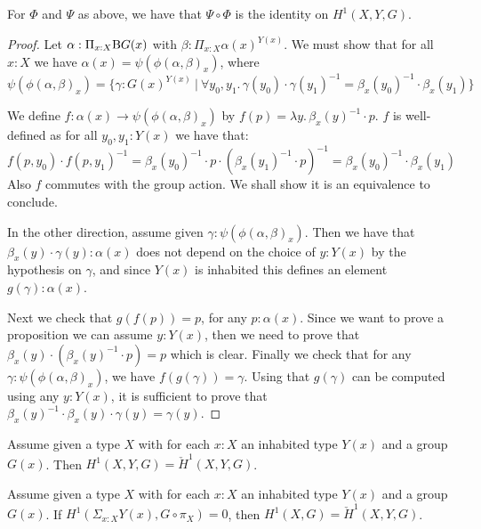 \begin{lemma}\label{PSiCircPhi}
  For $\Phi$ and $\Psi$ as above, we have that $\Psi\circ \Phi$ is the identity on $H^1(X,Y,G)$. 
\end{lemma}

\begin{proof}
Let $\alpha:\Pi_{x:X}\mathrm{B} G(x)$ with $\beta:\Pi_{x:X}\alpha(x)^{Y(x)}$. We must show that for all $x:X$ we have 
$\alpha(x) = \psi(\phi(\alpha,\beta)_x)$,
where
\[\psi(\phi(\alpha,\beta)_x) = \{\gamma:G(x)^{Y(x)}\ |\ \forall y_0,y_1.\, \gamma(y_0)\cdot\gamma(y_1)^{-1} = \beta_x(y_0)^{-1}\cdot\beta_x(y_1)\}\]

We define $f:\alpha(x)\to \psi(\phi(\alpha,\beta)_x)$ by $f(p) = \lambda y.\, \beta_x(y)^{-1}\cdot p$. $f$ is well-defined as for all $y_0,y_1:Y(x)$ we have that:
\[f(p,y_0)\cdot f(p,y_1)^{-1} = \beta_x(y_0)^{-1}\cdot p \cdot (\beta_x(y_1)^{-1}\cdot p)^{-1} = \beta_x(y_0)^{-1}\cdot\beta_x(y_1)\]
Also $f$ commutes with the group action. We shall show it is an equivalence to conclude. 

In the other direction, assume given $\gamma:\psi(\phi(\alpha,\beta)_x)$. Then we have that $\beta_x(y)\cdot\gamma(y):\alpha(x)$ does not depend on the choice of $y:Y(x)$ by the hypothesis on $\gamma$, and since $Y(x)$ is inhabited this defines an element $g(\gamma):\alpha(x)$.

Next we check that $g(f(p)) = p$, for any $p:\alpha(x)$. Since we want to prove a proposition we can assume $y:Y(x)$, then we need to prove that $\beta_x(y)\cdot (\beta_x(y)^{-1}\cdot p) = p$ which is clear. Finally we check that for any $\gamma:\psi(\phi(\alpha,\beta)_x)$, we have $f(g(\gamma)) = \gamma$. Using that $g(\gamma)$ can be computed using any $y:Y(x)$, it is sufficient to prove that $\beta_x(y)^{-1}\cdot \beta_x(y) \cdot \gamma(y) = \gamma(y)$.
\end{proof}

\begin{corollary}\label{non-abelian-chech-is-sheaf-generic}
Assume given a type $X$ with for each $x:X$ an inhabited type $Y(x)$ and a group $G(x)$. Then $H^1(X,Y,G) = \check{H}^1(X,Y,G)$.
\end{corollary}

\begin{corollary}\label{non-abelian-chech-is-sheaf-generic-ayclic-cover}
Assume given a type $X$ with for each $x:X$ an inhabited type $Y(x)$ and a group $G(x)$. If $H^1(\Sigma_{x:X}Y(x), G\circ\pi_X) = 0$, then $H^1(X,G) = \check{H}^1(X,Y,G)$.
\end{corollary}
